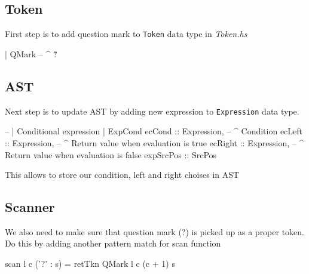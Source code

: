 \documentclass{article}
\begin{document}
\subsection{Token}
\begin{flushleft}
First step is to add question mark to \texttt{Token} data type in \textit{Token.hs}
\end{flushleft}
\begin{code}
| QMark     -- ^ \"?\"
\end{code}

\subsection{AST}
\begin{flushleft}
Next step is to update AST by adding new expression to \texttt{Expression} data type.
\end{flushleft}
\begin{code}
-- | Conditional expression
| ExpCond {
    ecCond      :: Expression,      -- ^ Condition
    ecLeft      :: Expression,      -- ^ Return value when evaluation is true
    ecRight     :: Expression,      -- ^ Return value when evaluation is false
    expSrcPos   :: SrcPos
  }
\end{code}
\begin{flushleft}
This allows to store our condition, left and right choises in AST
\end{flushleft}

\subsection{Scanner}
\begin{flushleft}
We also need to make sure that question mark (?) is picked up as a proper token. Do this by adding another pattern match for scan function
\end{flushleft}
\begin{code}
scan l c ('?' : s)  = retTkn QMark l c (c + 1) s
\end{code}
\end{document}
